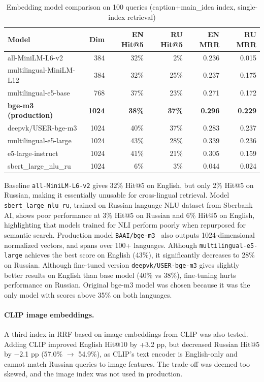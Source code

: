 \documentclass[a4paper,12pt]{article}
\begin{document}
\begin{table}[H]
\centering
\caption{Embedding model comparison on 100 queries (caption+main\_idea index, single-index retrieval)}
\label{tab:embed_compare}
\begin{tabular}{|l|r|r|r|r|r|}
\hline
\textbf{Model} & \textbf{Dim} & \textbf{EN Hit@5} & \textbf{RU Hit@5} & \textbf{EN MRR} & \textbf{RU MRR} \\
\hline
all-MiniLM-L6-v2 & 384 & 32\% & 2\% & 0.236 & 0.015 \\
\hline
multilingual-MiniLM-L12 & 384 & 32\% & 25\% & 0.237 & 0.175 \\
\hline
multilingual-e5-base & 768 & 37\% & 23\% & 0.271 & 0.172 \\
\hline
\textbf{bge-m3 (production)} & \textbf{1024} & \textbf{38\%} & \textbf{37\%} & \textbf{0.296} & \textbf{0.229} \\
\hline
deepvk/USER-bge-m3 & 1024 & 40\% & 37\% & 0.283 & 0.237 \\
\hline
multilingual-e5-large & 1024 & 43\% & 28\% & 0.339 & 0.236 \\
\hline
e5-large-instruct & 1024 & 41\% & 21\% & 0.305 & 0.159 \\
\hline
sbert\_large\_nlu\_ru & 1024 & 6\% & 3\% & 0.044 & 0.024 \\
\hline
\end{tabular}
\end{table}

Baseline \texttt{all-MiniLM-L6-v2} gives 32\% Hit@5 on English, but only 2\% Hit@5 on Russian, making it essentially unusable for cross-lingual retrieval. Model \texttt{sbert\_large\_nlu\_ru}, trained on Russian language NLU dataset from Sberbank AI, shows poor performance at 3\% Hit@5 on Russian and 6\% Hit@5 on English, highlighting that models trained for NLI perform poorly when repurposed for semantic search. Production model \texttt{BAAI/bge-m3}~\cite{chen2024bge} also outputs 1024-dimensional normalized vectors, and spans over 100+ languages. Although \texttt{multilingual-e5-large} achieves the best score on English (43\%), it significantly decreases to 28\% on Russian. Although fine-tuned version \texttt{deepvk/USER-bge-m3} gives slightly better results on English than base model (40\% vs 38\%), fine-tuning hurts performance on Russian. Original bge-m3 model was chosen because it was the only model with scores above 35\% on both languages.

\paragraph{CLIP image embeddings.} A third index in RRF based on image embeddings from CLIP was also tested. Adding CLIP improved English Hit@10 by +3.2 pp, but decreased Russian Hit@5 by $-$2.1 pp (57.0\% $\to$ 54.9\%), as CLIP's text encoder is English-only and cannot match Russian queries to image features. The trade-off was deemed too skewed, and the image index was not used in production.
\end{document}
